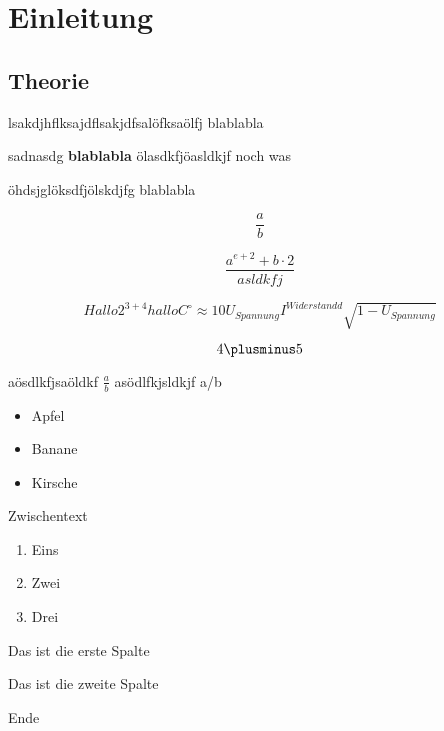 \documentclass{protokoll}
\begin{document}
\section{Einleitung}

\subsection{Theorie}

lsakdjhflksajdflsakjdfsalöfksaölfj
blablabla

sadnasdg \textbf{blablabla} ölasdkfjöasldkjf
noch was 

öhdsjglöksdfjölskdjfg
blablabla

\begin{equation}
\frac{a}{b}
\end{equation}


\begin{equation}
\frac{a^{e + 2} + b\cdot2}{ asldkfj }
\end{equation}


\begin{equation}
Hallo 2^{3 + 4} hallo C^\circ \approx 10 U_{Spannung} I^{Widerstandd} \sqrt{1 - U_{Spannung}}
\end{equation}


\begin{equation}
4 \plusminus 5
\end{equation}



aösdlkfjsaöldkf $ \frac{a}{b} $
asödlfkjsldkjf
a/b 

\begin{itemize}

\item Apfel
\item Banane
\item Kirsche

\end{itemize}


Zwischentext

\begin{enumerate}

\item Eins
\item Zwei
\item Drei

\end{enumerate}


\begin{spalten}

Das ist die erste Spalte

\anderespalte
Das ist die zweite Spalte

\end{spalten}


 

Ende
\end{document}
